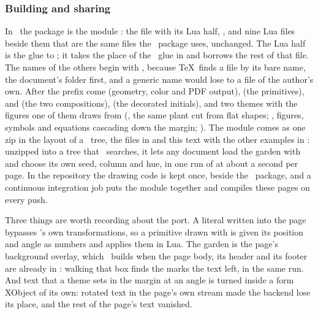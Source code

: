 \subsubsection{Building and sharing}

In \CONTEXT\ the package is the module : the file
 with its Lua half, , and nine Lua files
beside them that are the same files the \LATEX\ package uses, unchanged. The Lua half is the
glue to \CONTEXT; it takes the place of the \LATEX\ glue in  and
borrows the rest of that file. The names of the others begin with ,
because \TeX\ finds a file by its bare name, the document's folder first, and a generic
name would lose to a file of the author's own. After the prefix come  (geometry,
color and PDF output),  (the primitives),  and  (the
two compositions),  (the decorated initials), and two themes with the figures
one of them draws from (, the same plant cut from flat shapes;
, figures, symbols and equations cascading down the margin;
). The module comes as one zip in the layout of a \TEX\ tree, the files in
 and this text with the other examples in
: unzipped into a tree that \CONTEXT\ searches, it lets
any document load the garden with \type{\usemodule[florilegium]} and choose its own seed,
column and hue, in one run of  at about a second per page. In the repository
the drawing code is kept once, beside the \LATEX\ package, and a continuous integration job
puts the module together and compiles these pages on every push.

\startremark
Three things are worth recording about the port. A literal written into the page bypasses
\CONTEXT's own transformations, so a primitive drawn with \type{\florilegiumdraw} is given
its position and angle as numbers and applies them in Lua. The garden is the page's
background overlay, which \CONTEXT\ builds when the page body, its header and its footer
are already in \type{\pagebox}: walking that box finds the marks the text left, in the
same run. And text that a theme sets in the margin at an angle is turned inside a form
XObject of its own: rotated text in the page's own stream made the backend lose its place,
and the rest of the page's text vanished.
\stopremark
